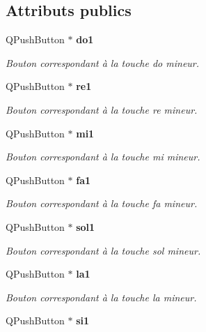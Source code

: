 \subsection*{Attributs publics}
\begin{DoxyCompactItemize}
\item 
Q\-Push\-Button $\ast$ {\bf do1}\label{class_clavier_piano_aadb5136daa81a6687ac7e0ced227d325}

\begin{DoxyCompactList}\small\item\em Bouton correspondant à la touche do mineur. \end{DoxyCompactList}\item 
Q\-Push\-Button $\ast$ {\bf re1}\label{class_clavier_piano_aebdccde190d79e591fdc9dbfb51758fd}

\begin{DoxyCompactList}\small\item\em Bouton correspondant à la touche re mineur. \end{DoxyCompactList}\item 
Q\-Push\-Button $\ast$ {\bf mi1}\label{class_clavier_piano_aa6fee0b94c86525216442a14b0c836e5}

\begin{DoxyCompactList}\small\item\em Bouton correspondant à la touche mi mineur. \end{DoxyCompactList}\item 
Q\-Push\-Button $\ast$ {\bf fa1}\label{class_clavier_piano_af95f08af4576f6e09d4a5d95359273d6}

\begin{DoxyCompactList}\small\item\em Bouton correspondant à la touche fa mineur. \end{DoxyCompactList}\item 
Q\-Push\-Button $\ast$ {\bf sol1}\label{class_clavier_piano_a36455016346d1b256b3758f9daa9d44e}

\begin{DoxyCompactList}\small\item\em Bouton correspondant à la touche sol mineur. \end{DoxyCompactList}\item 
Q\-Push\-Button $\ast$ {\bf la1}\label{class_clavier_piano_a373479513390a61eda79f6b9eea8a636}

\begin{DoxyCompactList}\small\item\em Bouton correspondant à la touche la mineur. \end{DoxyCompactList}\item 
Q\-Push\-Button $\ast$ {\bf si1}\label{class_clavier_piano_ab623aa890744b86490495589ae0cc753}


\end{DoxyCompactItemize}
